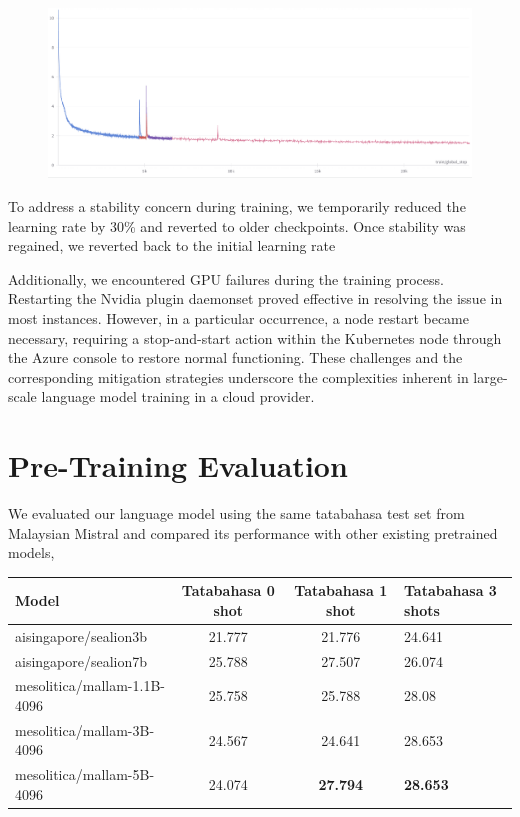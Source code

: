 \documentclass{article}
\begin{document}
\begin{figure}[h]
  \centering
  \includegraphics[width=0.6\linewidth]{pic/hiccup.png} %
\end{figure}

To address a stability concern during training, we temporarily reduced the learning rate by 30\% and reverted to older checkpoints. Once stability was regained, we reverted back to the initial learning rate

Additionally, we encountered GPU failures during the training process. Restarting the Nvidia plugin daemonset proved effective in resolving the issue in most instances. However, in a particular occurrence, a node restart became necessary, requiring a stop-and-start action within the Kubernetes node through the Azure console to restore normal functioning. These challenges and the corresponding mitigation strategies underscore the complexities inherent in large-scale language model training in a cloud provider.

\section{Pre-Training Evaluation}

We evaluated our language model using the same tatabahasa test set from Malaysian Mistral \cite{zolkepli2024large} and compared its performance with other existing pretrained models,

\begin{table}[h]
  \centering
  \begin{tabular}{lccl}
    \hline
    \textbf{Model}              & \textbf{Tatabahasa 0 shot} & \textbf{Tatabahasa 1 shot} & \textbf{Tatabahasa 3 shots} \\
    \hline
    aisingapore/sealion3b       & 21.777                     & 21.776                     & 24.641                      \\
    aisingapore/sealion7b       & 25.788                     & 27.507                     & 26.074                      \\
    mesolitica/mallam-1.1B-4096 & 25.758                     & 25.788                     & 28.08                       \\
    mesolitica/mallam-3B-4096   & 24.567                     & 24.641                     & 28.653                      \\
    mesolitica/mallam-5B-4096   & 24.074                     & \textbf{27.794}            & \textbf{28.653}             \\
    \hline
  \end{tabular}
\end{table}
\end{document}
